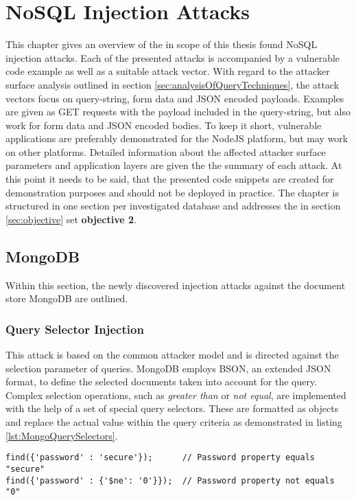 \chapter{NoSQL Injection Attacks}
This chapter gives an overview of the in scope of this thesis found NoSQL injection attacks. Each of the presented attacks is accompanied by a vulnerable code example as well as a suitable attack vector. With regard to the attacker surface analysis outlined in section \ref{sec:analysisOfQueryTechniques}, the attack vectors focus on query-string, form data and JSON encoded payloads. Examples are given as GET requests with the payload included in the query-string, but also work for form data and JSON encoded bodies. To keep it short, vulnerable applications are preferably demonstrated for the NodeJS platform, but may work on other platforms. Detailed information about the affected attacker surface parameters and application layers are given the the summary of each attack. At this point it needs to be said, that the presented code snippets are created for demonstration purposes and should not be deployed in practice. The chapter is structured in one section per investigated database and addresses the in section \ref{sec:objective} set \textbf{objective 2}. 

\section{MongoDB}
Within this section, the newly discovered injection attacks against the document store MongoDB are outlined.

\subsection{Query Selector Injection}
This attack is based on the common attacker model and is directed against the selection parameter of queries. MongoDB employs BSON, an extended JSON format, to define the selected documents taken into account for the query. Complex selection operations, such as \emph{greater than} or \emph{not equal}, are implemented with the help of a set of special query selectors. These are formatted as objects and replace the actual value within the query criteria as demonstrated in listing \ref{lst:MongoQuerySelectors}. \\

\begin{lstlisting}[caption={Example for MongoDB's query selectors}, label={lst:MongoQuerySelectors}]
find({'password' : 'secure'});      // Password property equals "secure"
find({'password' : {'$ne': '0'}});  // Password property not equals "0"
\end{lstlisting}

